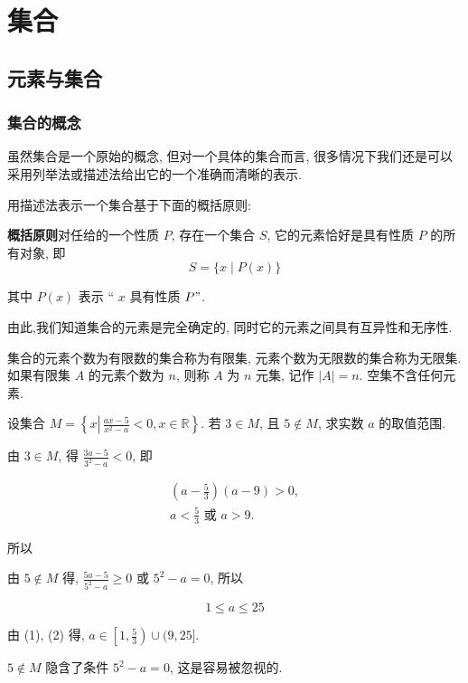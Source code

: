 \chapter{集合}
\section{元素与集合}
\subsection{集合的概念}
虽然集合是一个原始的概念, 但对一个具体的集合而言, 很多情况下我们还是可以采用列举法或描述法给出它的一个准确而清晰的表示.

用描述法表示一个集合基于下面的概括原则:

\textbf{概括原则}\quad 对任给的一个性质 $P$, 存在一个集合 $S$, 它的元素恰好是具有性质 $P$ 的所有对象, 即
$$
	S=\{x \mid P(x)\}
$$

其中 $P(x)$ 表示 “ $x$ 具有性质 $P "$.

由此,我们知道集合的元素是完全确定的, 同时它的元素之间具有互异性和无序性.

集合的元素个数为有限数的集合称为有限集, 元素个数为无限数的集合称为无限集. 如果有限集 $A$ 的元素个数为 $n$, 则称 $A$ 为 $n$ 元集, 记作 $|A|=n$. 空集不含任何元素.

\begin{example}
	设集合 $M=\left\{x \left\lvert\, \frac{a x-5}{x^{2}-a}<0\right., x \in \mathbb{R}\right\}$. 若 $3 \in M$, 且 $5 \notin M$, 求实数 $a$ 的取值范围.
\end{example}
\begin{solution}
	由 $3 \in M$, 得 $\frac{3 a-5}{3^{2}-a}<0$, 即

	\begin{gather*}
		\left(a-\frac{5}{3}\right)(a-9)>0, \\
		a<\frac{5}{3} \text { 或 } a>9 . \tag{1}
	\end{gather*}


	所以

	由 $5 \notin M$ 得, $\frac{5 a-5}{5^{2}-a} \geqslant 0$ 或 $5^{2}-a=0$, 所以

	\begin{equation*}
		1 \leqslant a \leqslant 25 \tag{2}
	\end{equation*}


	由 (1), (2) 得, $a \in\left[1, \frac{5}{3}\right) \cup(9,25]$.
\end{solution}
\begin{analysis}
	$5 \notin M$ 隐含了条件 $5^{2}-a=0$, 这是容易被忽视的.
\end{analysis}

